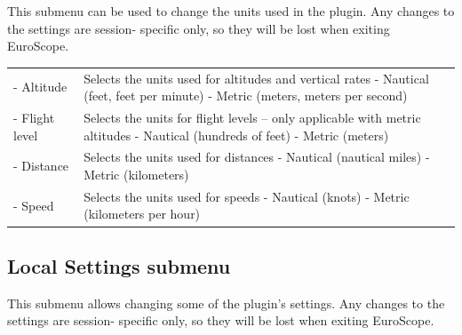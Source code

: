 \documentclass[11pt,a4paper,oldfontcommands]{memoir}
\begin{document}
This submenu can be used to change the units used in the plugin. Any changes to the settings are session-
specific only, so they will be lost when exiting EuroScope.

\begin{tabular}{l l}
    \\- Altitude & Selects the units used for altitudes and vertical rates
    - Nautical (feet, feet per minute)
    - Metric (meters, meters per second)
    \\- Flight level & Selects the units for flight levels – only applicable with metric altitudes
    - Nautical (hundreds of feet)
    - Metric (meters)
    \\- Distance & Selects the units used for distances
    - Nautical (nautical miles)
    - Metric (kilometers)
    \\- Speed & Selects the units used for speeds
    - Nautical (knots)
    - Metric (kilometers per hour)
\end{tabular}

\subsection*{Local Settings submenu}
\label{menu:localset}

This submenu allows changing some of the plugin’s settings. Any changes to the settings are session-
specific only, so they will be lost when exiting EuroScope.
\medskip
\end{document}
